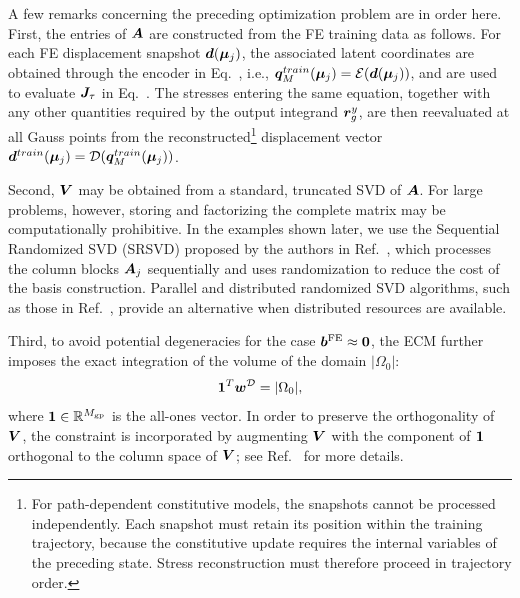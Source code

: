 \documentclass[preprint,10pt]{elsarticle}  %
\begin{document}
A few remarks concerning the preceding optimization problem are in order here.  First, the entries of \(\bm{A}\) are constructed from the FE training
data as follows. For each FE displacement snapshot
\(\bm{d}(\bm{\mu}_j)\), the associated latent coordinates are obtained
through the encoder in Eq.~, i.e.,
\(\bm{q}_M^{train}(\bm{\mu}_j)=\mathcal{\boldsymbol{E}}(\bm{d}(\bm{\mu}_j))\), and are used to
evaluate \(\bm{J}_{\tau}\) in Eq.~. The stresses
entering the same equation, together with any other   quantities
required by the output integrand \(\bm{r}^{{y}}_{g}\), are then reevaluated at all
Gauss points from the reconstructed\footnote{For path-dependent constitutive models, the snapshots cannot
be processed independently. Each snapshot must retain its position
within the training trajectory, because the constitutive update requires
the internal variables of the preceding state. Stress reconstruction
must therefore proceed in trajectory order.} displacement vector
\(\bm{d}^{train}(\bm{\mu}_j) =
\mathcal{\boldsymbol{D}}(\bm{q}_M^{train}(\bm{\mu}_j))\).

 Second,  \(\bm{V}\) may   be obtained from a standard,  truncated SVD of \(\bm{A}\).
For large problems, however, storing and factorizing the complete matrix
may be computationally prohibitive. In the examples shown later, we use the Sequential
Randomized SVD (SRSVD) proposed by the authors in   Ref.~\cite{hernandez2024cecm}, which processes the
column blocks \(\bm{A}_j\) sequentially and uses randomization to reduce
the cost of the basis construction. Parallel and distributed
randomized SVD algorithms, such as those in Ref.~\cite{ares2025parallel}, provide
an alternative when distributed resources are available.

 Third, to avoid  potential degeneracies for the case $\bm{b}^{\mathrm{FE}}\approx\bm{0}$, the ECM further imposes the  exact integration of the volume of the domain $|\Omega_0|$:
\begin{equation}
\label{eq:ECM_volume_constraint}
\bm{1}^T\bm{w}^{\mathcal{D}}
=
|\Omega_0|,
\end{equation}
where \(\bm{1}\in\mathbb{R}^{M_{\mathrm{gp}}}\) is the all-ones vector. In order to preserve the orthogonality of $\bm{V}$, the
constraint is incorporated by
augmenting \(\bm{V}\) with the component of \(\bm{1}\) orthogonal to the column space of
$\bm{V}$; see
Ref.~\cite{hernandez2024cecm} for more details.
\end{document}
